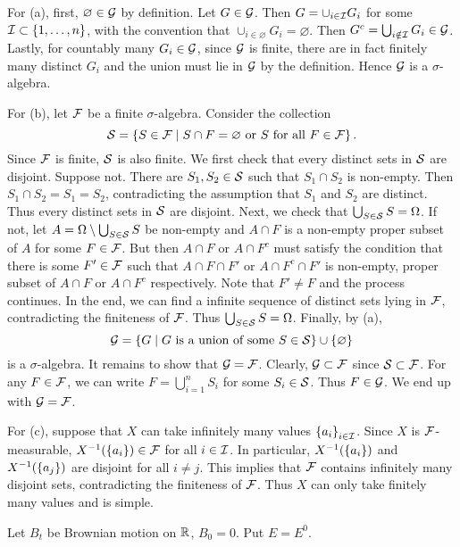 \begin{solution}
    For (a), first, $\varnothing\in\G$ by definition. Let $G\in\G$. Then $G = 
    \cup_{i\in\I}G_i$ for some $\I\subset\set{1,\ldots,n}$, with the convention that 
    $\cup_{i\in\varnothing}G_i = \varnothing$. Then $G^c = \bigcup_{i\notin\I}G_i\in\G$. 
    Lastly, for countably many $G_i\in\G$, since $\G$ is finite, there are in fact 
    finitely many distinct $G_i$ and the union must lie in $\G$ by the definition. 
    Hence $\G$ is a $\sigma$-algebra. 

    For (b), let $\F$ be a finite $\sigma$-algebra. Consider the collection 
    \begin{equation*}
        \S = \Set{S\in\F}{\text{$S\cap F = \varnothing$ or $S$ for all $F\in\F$}}.
    \end{equation*}
    Since $\F$ is finite, $\S$ is also finite. We first check that every distinct 
    sets in $\S$ are disjoint. Suppose not. There are $S_1, S_2\in\S$ such that 
    $S_1\cap S_2$ is non-empty. Then $S_1\cap S_2 = S_1 = S_2$, contradicting the 
    assumption that $S_1$ and $S_2$ are distinct. Thus every distinct sets in 
    $\S$ are disjoint. Next, we check that $\bigcup_{S\in\S} S = \Omega$. If not, 
    let $A = \Omega\setminus\bigcup_{S\in\S} S$ be non-empty and $A\cap F$ is a 
    non-empty proper subset of $A$ for some $F\in\F$. But then $A\cap F$ or 
    $A\cap F^c$ must satisfy the condition that there is some $F'\in\F$ such that
    $A\cap F\cap F'$ or $A\cap F^c\cap F'$ is non-empty, proper subset of 
    $A\cap F$ or $A\cap F^c$ respectively. Note that $F'\neq F$ and the process 
    continues. In the end, we can find a infinite sequence of distinct sets lying 
    in $\F$, contradicting the finiteness of $\F$. Thus $\bigcup_{S\in\S} S = \Omega$.
    Finally, by (a),
    \begin{equation*}
        \G = \Set{G}{G\text{ is a union of some } S\in\S}\cup\set{\varnothing}
    \end{equation*}
    is a $\sigma$-algebra. It remains to show that $\G = \F$. Clearly, $\G\subset\F$ since 
    $\S\subset\F$. For any $F\in\F$, we can write $F = \bigcup_{i=1}^n S_i$ for some 
    $S_i\in\S$. Thus $F\in\G$. We end up with $\G = \F$. 
    
    For (c), suppose that $X$ can take infinitely many values $\set{a_i}_{i\in\I}$. 
    Since $X$ is $\F$-measurable, $X^{-1}(\set{a_i})\in\F$ for all $i\in\I$. In particular, 
    $X^{-1}(\set{a_i})$ and $X^{-1}(\set{a_j})$ are disjoint for all $i\neq j$. This 
    implies that $\F$ contains infinitely many disjoint sets, contradicting the 
    finiteness of $\F$. Thus $X$ can only take finitely many values and is simple. 
\end{solution}

\begin{exercise}{2.8}
    Let $B_t$ be Brownian motion on $\R$, $B_0 = 0$. Put $E = E^0$.
\end{exercise}